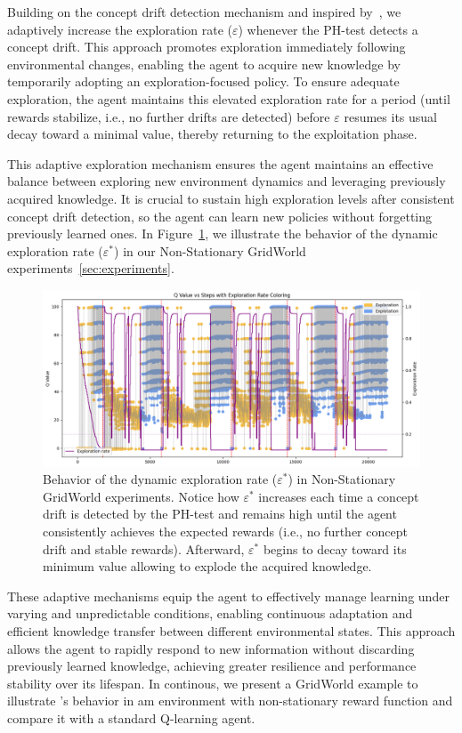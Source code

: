 Building on the concept drift detection mechanism and inspired by~\citet{mignon2017adaptive}, we adaptively increase the exploration rate ($\varepsilon$) whenever the PH-test detects a concept drift. This approach promotes exploration immediately following environmental changes, enabling the agent to acquire new knowledge by temporarily adopting an exploration-focused policy. To ensure adequate exploration, the agent maintains this elevated exploration rate for a period (until rewards stabilize, i.e., no further drifts are detected) before $\varepsilon$ resumes its usual decay toward a minimal value, thereby returning to the exploitation phase.

This adaptive exploration mechanism ensures the agent maintains an effective balance between exploring new environment dynamics and leveraging previously acquired knowledge. It is crucial to sustain high exploration levels after consistent concept drift detection, so the agent can learn new policies without forgetting previously learned ones. In Figure~\ref{fig:dynamic-eps}, we illustrate the behavior of the dynamic exploration rate ($\varepsilon^*$) in our Non-Stationary GridWorld experiments~\ref{sec:experiments}.

\begin{figure}
    \centering
    \includegraphics[width=\textwidth]{figures/epsilon.png}
    \caption{Behavior of the dynamic exploration rate ($\varepsilon^*$) in Non-Stationary GridWorld experiments. Notice how $\varepsilon^*$ increases each time a concept drift is detected by the PH-test and remains high until the agent consistently achieves the expected rewards (i.e., no further concept drift and stable rewards). Afterward, $\varepsilon^*$ begins to decay toward its minimum value allowing to explode the acquired knowledge.}
    \label{fig:dynamic-eps}
\end{figure}

These adaptive mechanisms equip the agent to effectively manage learning under varying and unpredictable conditions, enabling continuous adaptation and efficient knowledge transfer between different environmental states. This approach allows the agent to rapidly respond to new information without discarding previously learned knowledge, achieving greater resilience and performance stability over its lifespan. In continous, we present a GridWorld example to illustrate \adaptiverl's behavior in am environment with non-stationary reward function and compare it with a standard Q-learning agent.


